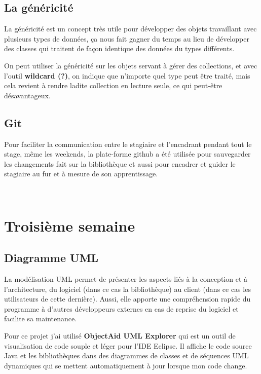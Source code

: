 \documentclass[12pt]{report}
\begin{document}
\subsection{La généricité}
La généricité est un concept très utile pour développer des objets travaillant avec plusieurs types de données, ça nous fait gagner du temps au lieu de développer des classes qui traitent de façon identique des données du types différents.\newline

On peut utiliser la généricité sur les objets servant à gérer des collections, et avec l'outil \textbf{wildcard (?)}, on indique que n'importe quel type peut être traité, mais cela revient à rendre ladite collection en lecture seule, ce qui peut-être désavantageux. 

\newpage
\subsection{Git}
Pour faciliter la communication entre le stagiaire et l'encadrant pendant tout le stage, même les weekends, la plate-forme github a été utilisée pour sauvegarder les changements fait sur la bibliothèque et aussi pour encadrer et guider le stagiaire au fur et à mesure de son apprentissage.

~\\
\section{Troisième semaine}

\subsection{Diagramme UML}

La modélisation UML permet de présenter les aspects liés à la conception et à l’architecture, du logiciel (dans ce cas la bibliothèque) au client (dans ce cas les utilisateurs de cette dernière). Aussi, elle apporte une compréhension rapide du programme à d’autres développeurs externes en cas de reprise du logiciel et facilite sa maintenance. \newline

Pour ce projet j'ai utilisé \textbf{ObjectAid UML Explorer} qui est un outil de visualisation de code souple et léger pour l'IDE Eclipse. Il affiche le code source Java et les bibliothèques dans des diagrammes de classes et de séquences UML dynamiques qui se mettent automatiquement à jour lorsque mon code change.\newline
\end{document}
